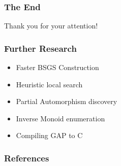 \documentclass{beamer}
\begin{document}
\begin{frame}
  \frametitle{The End}

  \begin{center}
    Thank you for your attention!
  \end{center}
\end{frame}

\begin{frame}
  \frametitle{Further Research}

  \begin{itemize}
    \setlength\itemsep{.25cm}

    \item<1-> Faster BSGS Construction
    \item<2-> Heuristic local search
    \item<3-> Partial Automorphism discovery
    \item<4-> Inverse Monoid enumeration
    \item<5-> Compiling GAP to C
  \end{itemize}
\end{frame}

\begin{frame}
  \frametitle{References}

  \tiny

  
  
\end{frame}
\end{document}
